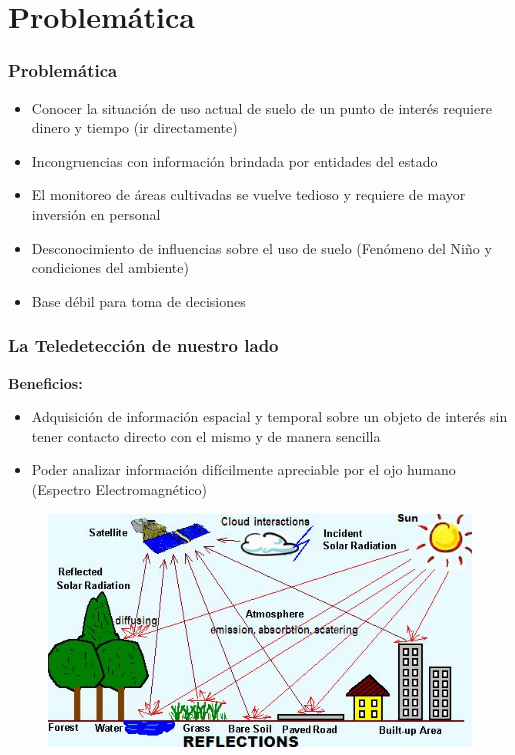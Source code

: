 \section{Problemática}


\begin{frame}
	\frametitle{Problemática}
	\begin{itemize}
		\item <1-> Conocer la situación de uso actual de suelo de un punto de interés requiere dinero y tiempo (ir directamente)
		\item <2-> Incongruencias con información brindada por entidades del estado 
		\item <3-> El monitoreo de áreas cultivadas se vuelve tedioso y requiere de mayor inversión en personal
		\item <4-> Desconocimiento de influencias sobre el uso de suelo (Fenómeno del Niño y condiciones del ambiente)
		\item <5-> Base débil para toma de decisiones
	\end{itemize}
\end{frame}


\begin{frame}
	\frametitle{La Teledetección de nuestro lado}
	\textbf{Beneficios:}
	
	\begin{itemize}
		\item Adquisición de información espacial y temporal sobre un objeto de interés sin tener contacto directo con el mismo y de manera sencilla
		\item Poder analizar información difícilmente apreciable por el ojo humano (Espectro Electromagnético)
	\end{itemize}
	
	\begin{figure}
		\includegraphics[scale=0.45]{imgs/remote_sensing.JPG}\
		\centering
	\end{figure}
	
\end{frame}

